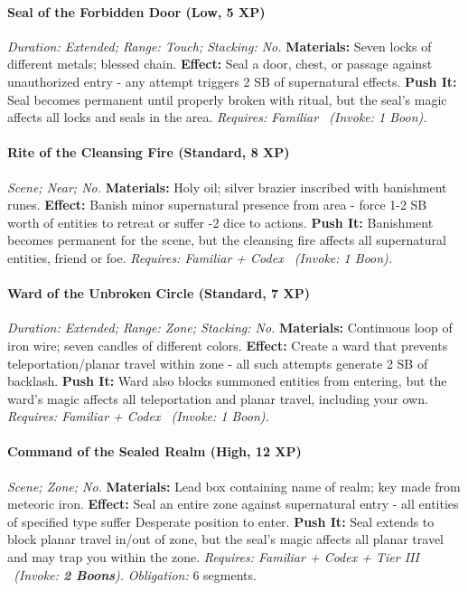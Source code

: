 \paragraph{Seal of the Forbidden Door (Low, 5 XP)} \emph{Duration: Extended; Range: Touch; Stacking: No.}
\textbf{Materials:} Seven locks of different metals; blessed chain.
\textbf{Effect:} Seal a door, chest, or passage against unauthorized entry - any attempt triggers 2 SB of supernatural effects.
\textbf{Push It:} Seal becomes permanent until properly broken with ritual, but the seal's magic affects all locks and seals in the area.
\emph{Requires: Familiar \ (\textit{Invoke:} 1 Boon).}
\paragraph{Rite of the Cleansing Fire (Standard, 8 XP)} \emph{Scene; Near; No.}
\textbf{Materials:} Holy oil; silver brazier inscribed with banishment runes.
\textbf{Effect:} Banish minor supernatural presence from area - force 1-2 SB worth of entities to retreat or suffer -2 dice to actions.
\textbf{Push It:} Banishment becomes permanent for the scene, but the cleansing fire affects all supernatural entities, friend or foe.
\emph{Requires: Familiar + Codex \ (\textit{Invoke:} 1 Boon).}
\paragraph{Ward of the Unbroken Circle (Standard, 7 XP)} \emph{Duration: Extended; Range: Zone; Stacking: No.}
\textbf{Materials:} Continuous loop of iron wire; seven candles of different colors.
\textbf{Effect:} Create a ward that prevents teleportation/planar travel within zone - all such attempts generate 2 SB of backlash.
\textbf{Push It:} Ward also blocks summoned entities from entering, but the ward's magic affects all teleportation and planar travel, including your own.
\emph{Requires: Familiar + Codex \ (\textit{Invoke:} 1 Boon).}
\paragraph{Command of the Sealed Realm (High, 12 XP)} \emph{Scene; Zone; No.}
\textbf{Materials:} Lead box containing name of realm; key made from meteoric iron.
\textbf{Effect:} Seal an entire zone against supernatural entry - all entities of specified type suffer Desperate position to enter.
\textbf{Push It:} Seal extends to block planar travel in/out of zone, but the seal's magic affects all planar travel and may trap you within the zone.
\emph{Requires: Familiar + Codex + Tier III \ (\textit{Invoke:} \textbf{2 Boons}).}
\emph{Obligation:} 6 segments.

